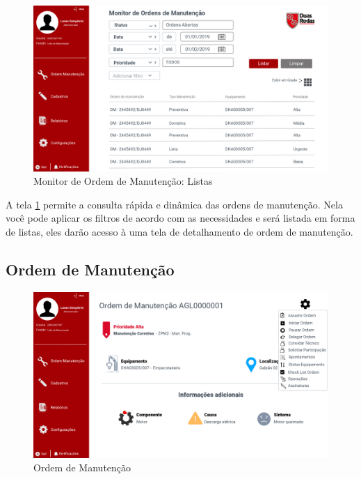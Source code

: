 \begin{figure}[htb]
	\caption{\label{web_monitor-om-lista}Monitor de Ordem de Manutenção: Listas}
	\begin{center}
		\includegraphics[scale=0.45]{./Figuras/web/monitor-om-lista.png}
	\end{center}
\end{figure}

A tela \ref{web_monitor-om-lista} permite a consulta rápida e dinâmica das ordens de manutenção. Nela você pode aplicar os filtros de acordo com as \newline necessidades e será listada em forma de listas, eles darão acesso à uma tela de detalhamento de ordem de manutenção.

\newpage
\subsection{Ordem de Manutenção}

\begin{figure}[htb]
	\caption{\label{web_om-capa}Ordem de Manutenção}
	\begin{center}
		\includegraphics[scale=0.40]{./Figuras/web/om-capa.png}
	\end{center}
\end{figure}


